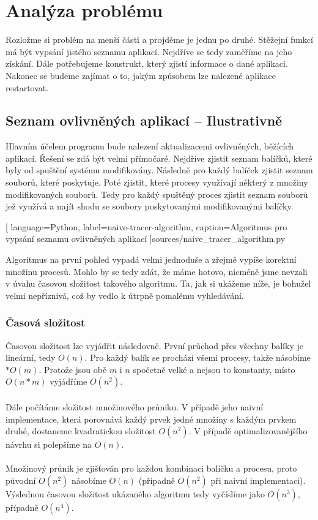 \documentclass[
  field=inf,
  biblatex,
  glossaries,
  index
]{kidiplom}
\begin{document}
\section{Analýza problému}
Rozložme si problém na menší části a projděme je jednu po druhé. Stěžejní funkcí má být vypsání jistého seznamu aplikací. Nejdříve se tedy zaměříme na jeho získání. Dále potřebujeme konstrukt, který zjistí informace o  dané aplikaci. Nakonec se budeme zajímat o to, jakým způsobem lze nalezené aplikace restartovat.

	\subsection{Seznam ovlivněných aplikací -- Ilustrativně}
	Hlavním účelem programu bude nalezení aktualizacemi ovlivněných, běžících aplikací. Řešení se zdá být velmi přímočaré. Nejdříve zjistit seznam balíčků, které byly od spuštění systému modifikovány. Následně pro každý balíček zjistit seznam souborů, které poskytuje. Poté zjistit, které procesy využívají některý z množiny modifikovaných souborů. Tedy pro každý spuštěný proces zjistit seznam souborů jež využívá a najít shodu se soubory poskytovanými modifikovanými balíčky.

	
	[
		language={Python},
		label=naive-tracer-algorithm,
		caption={Algoritmus pro vypsání seznamu ovlivněných aplikací}
	]{sources/naive_tracer_algorithm.py}

	Algoritmus na první pohled vypadá velmi jednoduše a zřejmě vypíše korektní množinu procesů. Mohlo by se tedy zdát, že máme hotovo, nicméně jsme nevzali v úvahu časovou složitost takového algoritmu. Ta, jak si ukážeme níže, je bohužel velmi nepříznivá, což by vedlo k útrpně pomalému vyhledávání.

		\subsubsection*{Časová složitost}
		Časovou složitost lze vyjádřit následovně. První průchod přes všechny balíky je lineární, tedy $O(n)$. Pro každý balík se prochází všemi procesy, takže násobíme $* O(m)$. Protože jsou obě $m$ i $n$ spočetně velké a nejsou to konstanty, místo $O(n*m)$ vyjádříme $O(n^2)$.
		\\
		\\
		Dále počítáme složitost množinového průniku. V případě jeho naivní implementace, která porovnává každý prvek jedné množiny s každým prvkem druhé, dostaneme kvadratickou složitost $O(n^2)$. V případě optimalizovanějšího návrhu si polepšíme na $O(n)$.
		\\
		\\
		Množinový průnik je zjišťován pro každou kombinaci balíčku a procesu, proto původní $O(n^2)$ násobíme $O(n)$ (případně $O(n^2)$ při naivní implementaci). Výslednou časovou složitost ukázaného algoritmu tedy vyčíslíme jako $O(n^3)$, případně $O(n^4)$.
\end{document}

